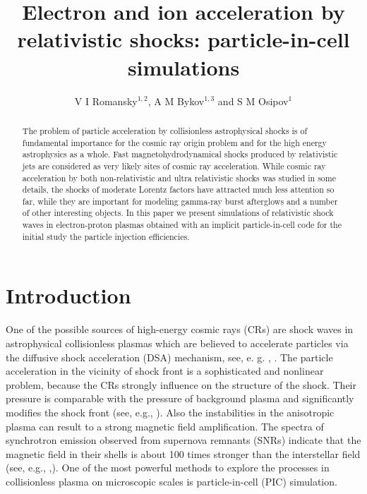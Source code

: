 \documentclass[a4paper]{jpconf}
\begin{document}
\title{Electron and ion acceleration by relativistic shocks: particle-in-cell simulations}

\author{V I Romansky$^{1,2}$, A M Bykov$^{1,3}$ and S M Osipov$^1$}

\address{$^1$ Ioffe Institute, 26 Politekhnicheskaya st., St. Petersburg 194021, Russia}
\address{$^2$
	Sternberg Astronomical Institute, Moscow State University
	Universitetsky pr., 13, Moscow 119234, Russia}
\address{$^3$ Peter the Great St.~Petersburg Polytechnic University, 29 Politekhnicheskaya st., St. Petersburg 195251, Russia}


\begin{abstract}
	The problem of particle acceleration by collisionless astrophysical shocks is of fundamental importance for the cosmic ray origin problem and  for the high energy astrophysics as a whole. Fast magnetohydrodynamical shocks produced by relativistic jets are considered as very likely sites of cosmic ray acceleration.
	While cosmic ray acceleration by both non-relativistic and ultra relativistic shocks was studied in some details, the shocks of moderate Lorentz factors have attracted much less attention so far, while they are important for modeling gamma-ray burst afterglows and a number of other interesting objects. In this paper we present simulations of relativistic shock waves in electron-proton plasmas obtained with an implicit particle-in-cell code for the initial study the particle injection efficiencies.
\end{abstract}
\section{Introduction}
One of the possible sources of high-energy cosmic rays (CRs) are shock waves in astrophysical collisionless plasmas which are believed to accelerate particles via  the diffusive shock acceleration (DSA) mechanism, see, e. g. \cite{Bell1978}, \cite{Blandford1978}. The particle acceleration in the vicinity of shock front is a sophisticated and nonlinear problem, because the CRs strongly influence on the structure of the shock. Their pressure is comparable with the pressure of background plasma and significantly modifies the shock front (see, e.g., \cite{Bykov2014}). 
Also the instabilities in the anisotropic plasma can result to a strong magnetic field amplification. The spectra of synchrotron emission observed from supernova remnants (SNRs) indicate that the magnetic field in their shells is about 100 times stronger than the interstellar field (see, e.g., \cite{Berezhko2003},\cite{Uchiyama2007}). 
One of the most powerful methods to explore the processes in collisionless plasma on microscopic scales is particle-in-cell (PIC) simulation.
\end{document}

